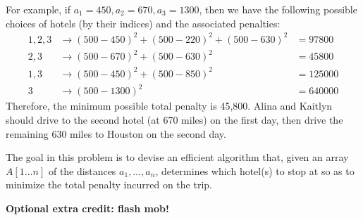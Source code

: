 \documentclass[11pt,addpoints]{exam}
\begin{document}
\begin{questions}
  For example, if $a_1 = 450, a_2 = 670, a_3 = 1300$, then we have the following possible choices of hotels (by their indices) and the associated penalties:
  \begin{align*}
    1, 2, 3 &\rightarrow (500 - 450)^2 + (500 - 220)^2 + (500 - 630)^2 &= 97800 \\
    2, 3 &\rightarrow (500 - 670)^2 + (500 - 630)^2 &= 45800 \\
    1,3 &\rightarrow (500 - 450)^2 + (500 - 850)^2 &= 125000 \\
    3 &\rightarrow (500 - 1300)^2 &= 640000
  \end{align*}
  Therefore, the minimum possible total penalty is 45,800.
  Alina and Kaitlyn should drive to the second hotel (at 670 miles) on the first day, then drive the remaining 630 miles to Houston on the second day.

  The goal in this problem is to devise an efficient algorithm that, given an array $A[1\ldots n]$ of the distances $a_1, \ldots, a_n$, determines which hotel(s) to stop at so as to minimize the total penalty incurred on the trip.


  
  \bonusquestion[6] \textbf{Optional extra credit: flash mob!}
  

\end{questions}
\end{document}
